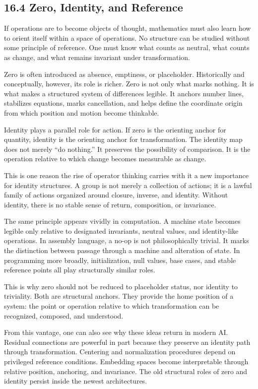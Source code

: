 \documentclass[
]{article}
\begin{document}
\hypertarget{zero-identity-and-reference}{%
\subsection{16.4 Zero, Identity, and
Reference}\label{zero-identity-and-reference}}

If operations are to become objects of thought, mathematics must also
learn how to orient itself within a space of operations. No structure
can be studied without some principle of reference. One must know what
counts as neutral, what counts as change, and what remains invariant
under transformation.

Zero is often introduced as absence, emptiness, or placeholder.
Historically and conceptually, however, its role is richer. Zero is not
only what marks nothing. It is what makes a structured system of
differences legible. It anchors number lines, stabilizes equations,
marks cancellation, and helps define the coordinate origin from which
position and motion become thinkable.

Identity plays a parallel role for action. If zero is the orienting
anchor for quantity, identity is the orienting anchor for
transformation. The identity map does not merely ``do nothing.'' It
preserves the possibility of comparison. It is the operation relative to
which change becomes measurable as change.

This is one reason the rise of operator thinking carries with it a new
importance for identity structures. A group is not merely a collection
of actions; it is a lawful family of actions organized around closure,
inverse, and identity. Without identity, there is no stable sense of
return, composition, or invariance.

The same principle appears vividly in computation. A machine state
becomes legible only relative to designated invariants, neutral values,
and identity-like operations. In assembly language, a no-op is not
philosophically trivial. It marks the distinction between passage
through a machine and alteration of state. In programming more broadly,
initialization, null values, base cases, and stable reference points all
play structurally similar roles.

This is why zero should not be reduced to placeholder status, nor
identity to triviality. Both are structural anchors. They provide the
home position of a system: the point or operation relative to which
transformation can be recognized, composed, and understood.

From this vantage, one can also see why these ideas return in modern AI.
Residual connections are powerful in part because they preserve an
identity path through transformation. Centering and normalization
procedures depend on privileged reference conditions. Embedding spaces
become interpretable through relative position, anchoring, and
invariance. The old structural roles of zero and identity persist inside
the newest architectures.
\end{document}
